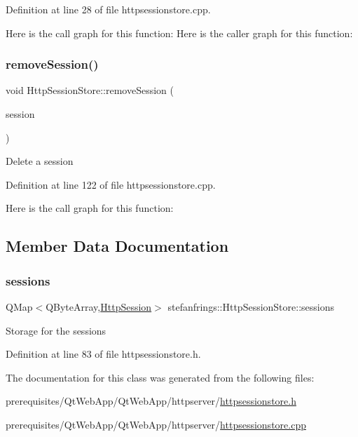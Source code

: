 Definition at line 28 of file httpsessionstore.\+cpp.

Here is the call graph for this function\+:
Here is the caller graph for this function\+:
\mbox{\label{classstefanfrings_1_1_http_session_store_a572d35ddc23b3ecac7c40aecc2b40a5e}} 
\subsubsection{\texorpdfstring{remove\+Session()}{removeSession()}}
{\footnotesize\ttfamily void Http\+Session\+Store\+::remove\+Session (\begin{DoxyParamCaption}\item[{\mbox{\hyperlink{classstefanfrings_1_1_http_session}{Http\+Session}}}]{session }\end{DoxyParamCaption})}

Delete a session 

Definition at line 122 of file httpsessionstore.\+cpp.

Here is the call graph for this function\+:


\subsection{Member Data Documentation}
\mbox{\label{classstefanfrings_1_1_http_session_store_a25bcdad5accd436881927a414b99ba22}} 
\subsubsection{\texorpdfstring{sessions}{sessions}}
{\footnotesize\ttfamily Q\+Map$<$Q\+Byte\+Array,\mbox{\hyperlink{classstefanfrings_1_1_http_session}{Http\+Session}}$>$ stefanfrings\+::\+Http\+Session\+Store\+::sessions\hspace{0.3cm}{\ttfamily [protected]}}

Storage for the sessions 

Definition at line 83 of file httpsessionstore.\+h.



The documentation for this class was generated from the following files\+:\begin{DoxyCompactItemize}
\item 
prerequisites/\+Qt\+Web\+App/\+Qt\+Web\+App/httpserver/\mbox{\hyperlink{httpsessionstore_8h}{httpsessionstore.\+h}}\item 
prerequisites/\+Qt\+Web\+App/\+Qt\+Web\+App/httpserver/\mbox{\hyperlink{httpsessionstore_8cpp}{httpsessionstore.\+cpp}}\end{DoxyCompactItemize}
